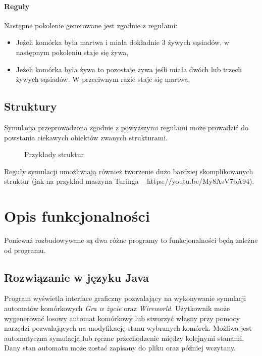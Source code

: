 \documentclass{mwart}
\begin{document}
\paragraph{Reguły} Następne pokolenie generowane jest zgodnie z regułami:
\begin{itemize}
\item Jeżeli komórka była martwa i miała dokładnie 3 żywych sąsiadów, w następnym pokoleniu staje się żywa,
\item Jeżeli komórka była żywa to pozostaje żywa jeśli miała dwóch lub trzech żywych sąsiadów. W przeciwnym razie staje się martwa.
\end{itemize}

\subsection{Struktury}
Symulacja przeprowadzona zgodnie z powyższymi regułami może prowadzić do powstania ciekawych obiektów zwanych strukturami. 

\begin{figure}[h]
\centering
\setlength{\fboxsep}{0pt} %
\setlength{\fboxrule}{1pt} %
\caption{Przykłady struktur}
\end{figure}

Reguły symulacji umożliwiają również tworzenie dużo bardziej skomplikowanych struktur (jak na przykład maszyna Turinga -- https://youtu.be/My8AsV7bA94).

\section{Opis funkcjonalności}
Ponieważ rozbudowywane są dwa różne programy to funkcjonalności będą zależne od programu.

\subsection{Rozwiązanie w języku Java}
Program wyświetla interface graficzny pozwalający na wykonywanie symulacji automatów komórkowych \textit{Gra w życie} oraz \textit{Wireworld}.
Użytkownik może wygenerować losowy automat komórkowy lub stworzyć własny przy pomocy narzędzi pozwalających na modyfikację stanu wybranych komórek.
Możliwa jest automatyczna symulacja lub ręczne przechodzenie między kolejnymi stanami.
Dany stan automatu może zostać zapisany do pliku oraz później wczytany.
\end{document}
